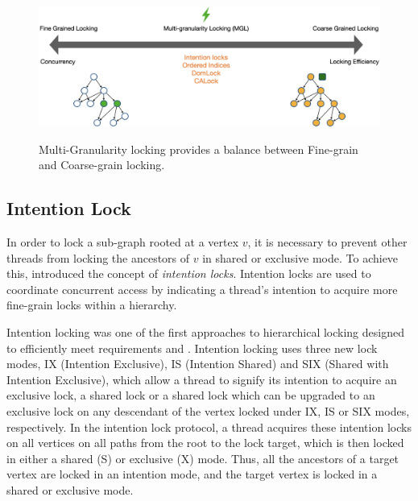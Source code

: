 \begin{figure}[h]
    \captionsetup{justification=centering}
    \includegraphics[width=\textwidth]{figures/MGLSpectrum.png}
    \label{fig:mglspectrum}
    \caption{Multi-Granularity locking provides a balance between Fine-grain and Coarse-grain locking.}
\end{figure}



\subsection{Intention Lock}

In order to lock a sub-graph rooted at a vertex $v$, it is necessary to prevent other threads from locking the ancestors of $v$ in shared or exclusive mode. To achieve this, \citet{gray1975granularity} introduced the concept of \emph{intention locks}. Intention locks are used to coordinate concurrent access by indicating a thread’s intention to acquire more fine-grain locks within a hierarchy. 



Intention locking was one of the first approaches to hierarchical locking designed to efficiently meet requirements \Rb and \Rc. Intention locking uses three new lock modes, IX (Intention Exclusive), IS (Intention Shared) and SIX (Shared with Intention Exclusive), which allow a thread to signify its intention to acquire an exclusive lock, a shared lock or a shared lock which can be upgraded to an exclusive lock on any descendant of the vertex locked under IX, IS or SIX modes, respectively. In the intention lock protocol, a thread acquires these intention locks on all vertices on all paths from the root to the lock target, which is then locked in either a shared (S) or exclusive (X) mode. Thus, all the ancestors of a target vertex are locked in an intention mode, and the target vertex is locked in a shared or exclusive mode.

